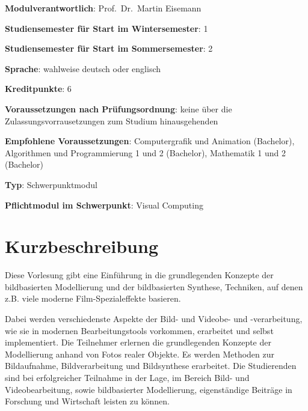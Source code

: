 \begin{modulHead}
\textbf{Modulverantwortlich}: Prof.~Dr.~Martin
Eisemann
\end{modulHead}
\begin{modulHead}
\textbf{Studiensemester für
Start im Wintersemester}:
1
\end{modulHead}
\begin{modulHead}
\textbf{Studiensemester für Start
im Sommersemester}:
2
\end{modulHead}
\begin{modulHead}
\textbf{Sprache}: wahlweise deutsch
oder englisch
\end{modulHead}
\begin{modulHead}
\textbf{Kreditpunkte}:
6
\end{modulHead}
\begin{modulHead}
\textbf{Voraussetzungen nach
Prüfungsordnung}: keine über die Zulassungsvorrausetzungen zum Studium
hinausgehenden
\end{modulHead}
\begin{modulHead}
\textbf{Empfohlene
Voraussetzungen}: Computergrafik und Animation (Bachelor), Algorithmen
und Programmierung 1 und 2 (Bachelor), Mathematik 1 und 2
(Bachelor)
\end{modulHead}
\begin{modulHead}
\textbf{Typ}:
Schwerpunktmodul
\end{modulHead}
\begin{modulHead}
\textbf{Pflichtmodul
im Schwerpunkt}: Visual Computing
\end{modulHead}


\section*{Kurzbeschreibung\label{/mi-2017/modulbeschreibungen-master/MA_VC_Modul_BildbasierteComputergrafik}}\label{kurzbeschreibungpathlabelmi-2017modulbeschreibungen-mastermaux5fvcux5fmodulux5fbildbasiertecomputergrafik}

Diese Vorlesung gibt eine Einführung in die grundlegenden Konzepte der
bildbasierten Modellierung und der bildbasierten Synthese, Techniken,
auf denen z.B. viele moderne Film-Spezialeffekte basieren.

Dabei werden verschiedenste Aspekte der Bild- und Videobe- und
-verarbeitung, wie sie in modernen Bearbeitungstools vorkommen,
erarbeitet und selbst implementiert. Die Teilnehmer erlernen die
grundlegenden Konzepte der Modellierung anhand von Fotos realer Objekte.
Es werden Methoden zur Bildaufnahme, Bildverarbeitung und Bildsynthese
erarbeitet. Die Studierenden sind bei erfolgreicher Teilnahme in der
Lage, im Bereich Bild- und Videobearbeitung, sowie bildbasierter
Modellierung, eigenständige Beiträge in Forschung und Wirtschaft leisten
zu können.

